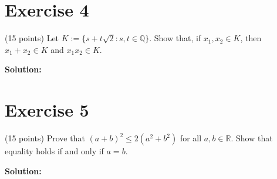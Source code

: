 \documentclass{article}
\begin{document}
\newpage

\section*{Exercise 4}
(15 points) Let $K := \{s + t\sqrt{2} : s,t \in \mathbb{Q}\}$. Show that, if $x_1, x_2 \in K$, then $x_1 + x_2 \in K$ and $x_1x_2 \in K$.

\textbf{Solution:}

\newpage

\section*{Exercise 5}
(15 points) Prove that $(a + b)^2 \leq 2(a^2 + b^2)$ for all $a,b \in \mathbb{R}$. Show that equality holds if and only if $a = b$.

\textbf{Solution:}
\end{document}
